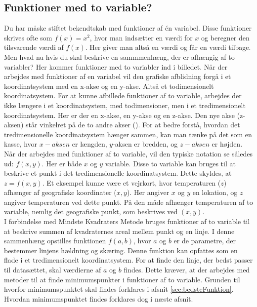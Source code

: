 \subsection{Funktioner med to variable?}\label{sec:FunktionerMedToVariable}
Du har måske stiftet bekendtskab med funktioner af én variabel. Disse funktioner skrives ofte som $f(x) = x^2$, hvor man indsætter en værdi for $x$ og beregner den tilsvarende værdi af $f(x)$. Her giver man altså en værdi og får en værdi tilbage. Men hvad nu hvis du skal beskrive en sammmenhæng, der er afhængig af to variabler? Her kommer funktioner med to variabler ind i billedet. Når der arbejdes med funktioner af en variabel vil den grafiske afblidning forgå i et koordinatsystem med en x-akse og en y-akse. Altså et todimensionelt koordinatsystem. For at kunne afbillede funktioner af to variable, arbejdes der ikke længere i et koordinatsystem, med todimensioner, men i et tredimensionelt koordinatsystem. Her er der en x-akse, en y-akse og en z-akse. Den nye akse (z-aksen) står vinkelret på de to andre akser (\cite[246-248]{funktionrAfToVariable}). For at bedre forstå, hvordan det tredimensionelle koordinatsystem hænger sammen, kan man tænke på det som en kasse, hvor  $x-aksen$ er længden, $y$-aksen er bredden, og $z-aksen$ er højden. Når der arbejdes med funktioner af to variable, vil den typiske notation se således ud: $f(x,y)$. Her er både $x$ og $y$ variable. Disse to variable kan bruges til at beskrive et punkt i det tredimensionelle koordinatsystem. Dette skyldes, at $z = f(x,y)$. Et eksempel kunne være et vejrkort, hvor temperaturen ($z$) afhænger af geografiske koordinater ($x, y$). Her angiver $x$ og $y$ en lokation, og $z$ angiver temperaturen ved dette punkt. På den måde afhænger temperaturen af to variable, nemlig det geografiske punkt, som beskrives ved $(x, y)$. \\
I forbindelse med Mindste Kvadraters Metode bruges funktioner af to variable til at beskrive summen af kvadraternes areal mellem punkt og en linje. I denne sammenhæng opstilles funktionen $f(a, b)$, hvor $a$ og $b$ er de parametre, der bestemmer linjens hældning og skæring. Denne funktion kan opfattes som en flade i et tredimensionelt koordinatsystem. 
For at finde den linje, der bedst passer til datasættet, skal værdierne af $a$ og $b$ findes. Dette kræver, at der arbejdes med metoder til at finde minimumspunkter i funktioner af to variable. Grunden til hvorfor minimumspunktet skal findes forklares i afsnit \ref{sec:bedsteFunktion}. Hvordan minimumspunktet findes forklares dog i næste afsnit.


